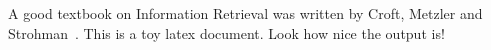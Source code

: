 \documentclass{article}
\begin{document}
A good textbook on Information Retrieval was written by Croft, Metzler and Strohman~\cite{croft2010search}. This is a toy latex document. Look how nice the output is!



\end{document}
